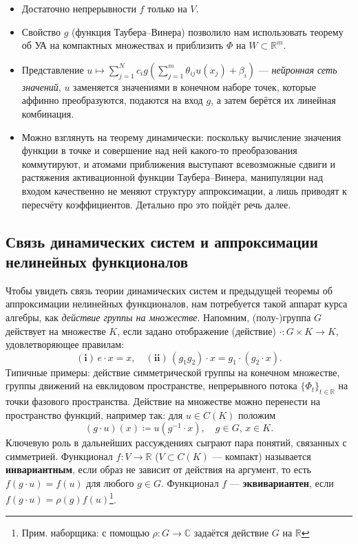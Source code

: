 \documentclass[../NDCNNAI_main.tex]{subfiles}
\begin{document}
\begin{remarks}
  \leavevmode
  \begin{itemize}
    \item Достаточно непрерывности $f$ только на $V$.
    \item Свойство $g$ (функция Таубера--Винера) позволило нам использовать теорему об УА на компактных множествах и приблизить $\Phi$ на $W \subset \mathbb{R}^m$.
    \item Представление $u \mapsto \sum_{j=1}^{N} c_i g(\sum_{j=1}^{m} \theta_{ij}u(x_j) + \beta_i)$ --- \emph{нейронная сеть значений}, $u$ заменяется значениями в конечном наборе точек, которые аффинно преобразуются, подаются на вход $g$, а затем берётся их линейная комбинация.
    \item Можно взглянуть на теорему динамически: поскольку вычисление значения функции в точке и совершение над ней какого-то преобразования коммутируют, и атомами приближения выступают всевозможные сдвиги и растяжения активационной функции Таубера--Винера, манипуляции над входом качественно не меняют структуру аппроксимации, а лишь приводят к пересчёту коэффициентов.
    Детально про это пойдёт речь далее.
  \end{itemize}
\end{remarks}

\subsection{Связь динамических систем и аппроксимации нелинейных функционалов}  
Чтобы увидеть связь теории динамических систем и предыдущей теоремы об аппроксимации нелинейных функционалов, нам потребуется такой аппарат курса алгебры, как \emph{действие группы на множестве}.
Напомним, (полу-)группа $G$ действует на множестве $K$, если задано отображение (действие) $\cdot \colon G \times K \to K$, удовлетворяющее правилам:
$$\mathbf{(i)}\,e \cdot x = x, \quad \mathbf{(ii)}\,(g_1g_2) \cdot x = g_1 \cdot (g_2 \cdot x).$$
Типичные примеры: действие симметрической группы на конечном множестве, группы движений на евклидовом пространстве, непрерывного потока $\{\Phi_t\}_{t \in \mathbb{R}}$ на точки фазового пространства.
Действие на множестве можно перенести на пространство функций, например так: для $u \in C(K)$ положим
$$(g \cdot u)(x) \coloneq u(g^{-1} \cdot x), \quad g \in G, \, x \in K.$$
Ключевую роль в дальнейших рассуждениях сыграют пара понятий, связанных с симметрией.
Функционал $f\colon V \to \mathbb{R}$ ($V \subset C(K)$ --- компакт) называется \textbf{инвариантным}, если образ не зависит от действия на аргумент, то есть $f(g \cdot u) = f(u)$ для любого $g \in G$.
Функционал $f$ --- \textbf{эквивариантен}, если $f(g \cdot u) = \rho(g)f(u)$\footnote{Прим. наборщика: с помощью $\rho\colon G \to \mathbb{C}$ задаётся действие $G$ на $\mathbb{R}$}. 
\end{document}
